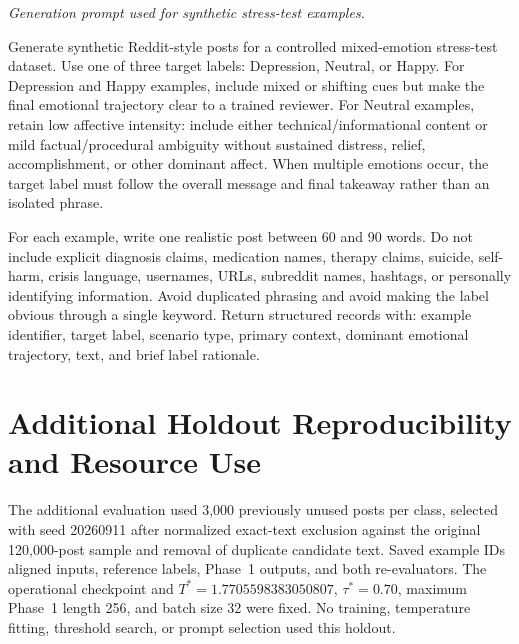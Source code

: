 \documentclass{ieeeaccess}
\begin{document}
\noindent\footnotesize\textit{Generation prompt used for synthetic stress-test examples.}\normalsize\par
\smallskip
\noindent
\begin{minipage}[t]{0.49\textwidth}\scriptsize
Generate synthetic Reddit-style posts for a controlled mixed-emotion stress-test dataset. Use one of three target labels: Depression, Neutral, or Happy. For Depression and Happy examples, include mixed or shifting cues but make the final emotional trajectory clear to a trained reviewer. For Neutral examples, retain low affective intensity: include either technical/informational content or mild factual/procedural ambiguity without sustained distress, relief, accomplishment, or other dominant affect. When multiple emotions occur, the target label must follow the overall message and final takeaway rather than an isolated phrase.
\end{minipage}\hfill
\begin{minipage}[t]{0.49\textwidth}\scriptsize
For each example, write one realistic post between 60 and 90 words. Do not include explicit diagnosis claims, medication names, therapy claims, suicide, self-harm, crisis language, usernames, URLs, subreddit names, hashtags, or personally identifying information. Avoid duplicated phrasing and avoid making the label obvious through a single keyword. Return structured records with: example identifier, target label, scenario type, primary context, dominant emotional trajectory, text, and brief label rationale.
\end{minipage}

\par\medskip
\clearpage
\section{Additional Holdout Reproducibility and Resource Use}
\label{app:additional-holdout}

The additional evaluation used 3,000 previously unused posts per class, selected with seed 20260911 after normalized exact-text exclusion against the original 120,000-post sample and removal of duplicate candidate text. Saved example IDs aligned inputs, reference labels, Phase~1 outputs, and both re-evaluators. The operational checkpoint and $T^*=1.7705598383050807$, $\tau^*=0.70$, maximum Phase~1 length 256, and batch size 32 were fixed. No training, temperature fitting, threshold search, or prompt selection used this holdout.
\end{document}
